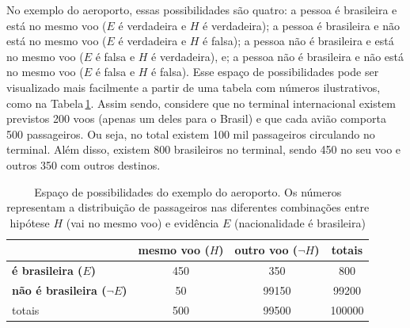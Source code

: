 \documentclass[./main.tex]{subfiles}
\begin{document}
\par No exemplo do aeroporto, essas possibilidades são quatro: a pessoa é brasileira e está no mesmo voo ($E$ é verdadeira e $H$ é verdadeira); a pessoa é brasileira e não está no mesmo voo ($E$ é verdadeira e $H$ é falsa); a pessoa não é brasileira e está no mesmo voo ($E$ é falsa e $H$ é verdadeira), e; a pessoa não é brasileira e não está no mesmo voo ($E$ é falsa e $H$ é falsa). Esse espaço de possibilidades pode ser visualizado mais facilmente a partir de uma tabela com números ilustrativos, como na Tabela\,\ref{tbl:bayes-aeroporto}. Assim sendo, considere que no terminal internacional existem previstos 200 voos (apenas um deles para o Brasil) e que cada avião comporta 500 passageiros. Ou seja, no total existem 100 mil passageiros circulando no terminal. Além disso, existem 800 brasileiros no terminal, sendo 450 no seu voo e outros 350 com outros destinos.
\begin{table}[ht]
    \centering	
    \small
    \begin{tabular}{ l  c  c  c} %
       & \textbf{mesmo voo ($H$)} & \textbf{outro voo ($\neg H$)} & totais\\  
        \hline
        \textbf{é brasileira ($E$)} & 450 & 350 & 800\\
        \textbf{não é brasileira ($\neg E$)} & 50 & 99150 & 99200\\
        \hline
        totais & 500 & 99500 & 100000\\
    \end{tabular}
    \caption[Espaço de possibilidades do exemplo do aeroporto]{Espaço de possibilidades do exemplo do aeroporto. Os números representam a distribuição de passageiros nas diferentes combinações entre hipótese $H$ (vai no mesmo voo) e evidência $E$ (nacionalidade é brasileira)}
    \label{tbl:bayes-aeroporto}
\end{table} 
\end{document}
